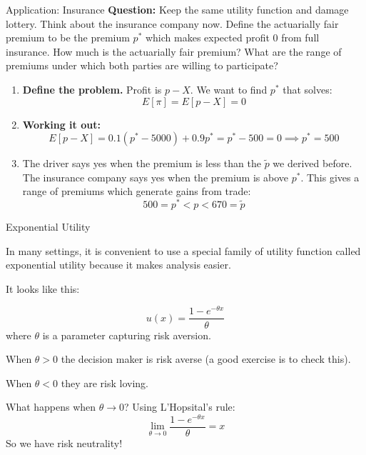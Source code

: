 \documentclass[aspectratio=169]{beamer}
\newenvironment{wideitemize}{\itemize\addtolength{\itemsep}{10pt}}{\enditemize}
\begin{document}
\begin{frame}{Application: Insurance}
\textbf{Question:} Keep the same utility function and damage lottery. Think about the insurance company now. Define the actuarially fair premium to be the premium $p^*$ which makes expected profit 0 from full insurance. How much is the actuarially fair premium? What are the range of premiums under which both parties are willing to participate?

\begin{enumerate}
    \item \textbf{Define the problem.} Profit is $p-X$. We want to find $p^*$ that solves:
    \[E[\pi]=E[p-X]=0\]
    \item \textbf{Working it out:}
    \[E[p-X] = 0.1 (p^*-5000)+0.9p^* = p^*-500=0 \implies p^*=500\]
    \item The driver says yes when the premium is less than the $\tilde p$ we derived before. The insurance company says yes when the premium is above $p^*$. This gives a range of premiums which generate gains from trade:
    \[500=p^* < p < 670 = \tilde p \]
\end{enumerate}

\end{frame}

\begin{frame}{Exponential Utility}
\begin{wideitemize}
    \item In many settings, it is convenient to use a special family of utility function called exponential utility because it makes analysis easier.
    \item   It looks like this:
    
    \[u(x) = \frac{1-e^{-\theta x}}{\theta} \]
    where $\theta$ is a parameter capturing risk aversion. 
    
    \item When $\theta>0$ the decision maker is risk averse (a good exercise is to check this).
    
    \item When $\theta<0$ they are risk loving.
    
       \item What happens when $\theta \to 0$? Using L'Hopsital's rule:
       \[\lim_{\theta \to 0}  \frac{1-e^{-\theta x}}{\theta} = x\]
       So we have risk neutrality!
    
\end{wideitemize}
   
    
\end{frame}
\end{document}
